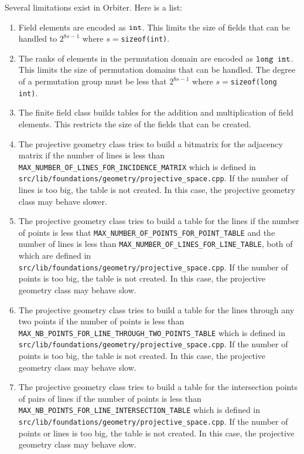 Several limitations exist in Orbiter. Here is a list:

\begin{enumerate}
\item
Field elements are encoded as  $\verb'int'$. This limits the size of fields that can be handled to $2^{8s-1}$ where $s=$\verb'sizeof(int)'.
\item
The ranks of elements in the permutation domain are encoded as  $\verb'long int'$. 
This limits the size of permutation domains that can be handled.
The degree of a permutation group must be less that $2^{8s-1}$ where $s=$\verb'sizeof(long int)'.
\item
The finite field class builds tables for the addition and multiplication of field elements. 
This restricts the size of the fields that can be created.
\item
The projective geometry class tries to build a bitmatrix for the adjacency matrix if the number of lines is less than 
\verb'MAX_NUMBER_OF_LINES_FOR_INCIDENCE_MATRIX' which is defined in \verb'src/lib/foundations/geometry/projective_space.cpp'. 
If the number of lines is too big, the table is not created. 
In this case, the projective geometry class may behave slower.
\item
The projective geometry class tries to build a table for the lines if the number of points is less that \verb'MAX_NUMBER_OF_POINTS_FOR_POINT_TABLE' and the number of 
lines is less than 
\verb'MAX_NUMBER_OF_LINES_FOR_LINE_TABLE', 
both of which are  defined in \verb'src/lib/foundations/geometry/projective_space.cpp'.
If the number of points is too big, the table is not created. 
In this case, the projective geometry class may behave slow.
\item
The projective geometry class tries to build a table for the lines through any two points if the number of points is less than 
\verb'MAX_NB_POINTS_FOR_LINE_THROUGH_TWO_POINTS_TABLE' 
which is defined in \verb'src/lib/foundations/geometry/projective_space.cpp'.
If the number of points is too big, the table is not created. 
In this case, the projective geometry class may behave slow.
\item
The projective geometry class tries to build a table for the intersection points of pairs of lines if the number of points is less than 
\verb'MAX_NB_POINTS_FOR_LINE_INTERSECTION_TABLE' 
which is defined in \verb'src/lib/foundations/geometry/projective_space.cpp'.
If the number of points or lines is too big, the table is not created. 
In this case, the projective geometry class may behave slow.

\end{enumerate}
